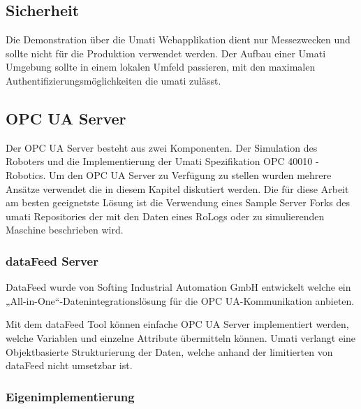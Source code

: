\documentclass[a4paper, 12pt, oneside]{scrbook}
\begin{document}
		
		\subsection{Sicherheit}
		
		Die Demonstration über die Umati Webapplikation dient nur Messezwecken und sollte nicht für die Produktion verwendet werden. Der Aufbau einer Umati Umgebung sollte in einem lokalen Umfeld passieren, mit den maximalen Authentifizierungsmöglichkeiten die umati zulässt. %
		
		\subsection{OPC UA Server}
			
		Der OPC UA Server besteht aus zwei Komponenten. Der Simulation des Roboters und die Implementierung der Umati Spezifikation OPC 40010 - Robotics. Um den OPC UA Server zu Verfügung zu stellen wurden mehrere Ansätze verwendet die in diesem Kapitel diskutiert werden. Die für diese Arbeit am besten geeignetste Lösung ist die Verwendung eines Sample Server Forks des umati Repositories der mit den Daten eines RoLogs oder zu simulierenden Maschine beschrieben wird. 
		
			\subsubsection{dataFeed Server}
			
			DataFeed wurde von Softing Industrial Automation GmbH entwickelt welche ein „All-in-One“-Datenintegrationslösung für die OPC UA-Kommunikation anbieten.
			
			Mit dem dataFeed Tool können einfache OPC UA Server implementiert werden, welche Variablen und einzelne Attribute übermitteln können. Umati verlangt eine  Objektbasierte Strukturierung der Daten, welche anhand der limitierten von dataFeed nicht umsetzbar ist.
			
			\subsubsection{Eigenimplementierung}
			
			
			
			
\end{document}

